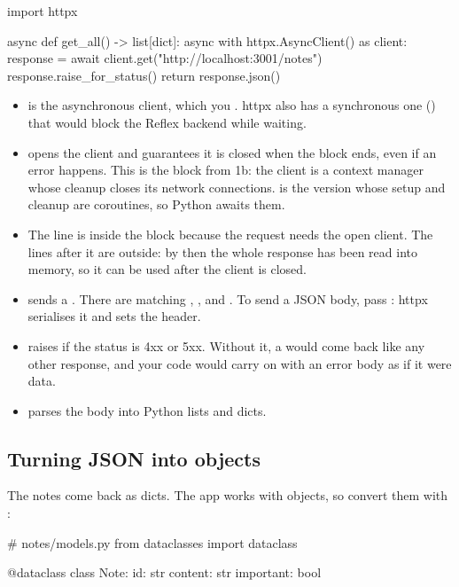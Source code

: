 \begin{py}
import httpx


async def get_all() -> list[dict]:
	async with httpx.AsyncClient() as client:
		response = await client.get("http://localhost:3001/notes")
	response.raise_for_status()
	return response.json()
\end{py}

\begin{itemize}
\item {} is the asynchronous client, which you . httpx also has a synchronous one () that would block the Reflex backend while waiting.
\item {} opens the client and guarantees it is closed when the block ends, even if an error happens. This is the  block from 1b: the client is a context manager whose cleanup closes its network connections.  is the version whose setup and cleanup are coroutines, so Python awaits them.
\item The  line is inside the  block because the request needs the open client. The lines after it are outside: by then the whole response has been read into memory, so it can be used after the client is closed.
\item {} sends a . There are matching , ,  and . To send a JSON body, pass : httpx serialises it and sets the  header.
\item {} raises  if the status is 4xx or 5xx. Without it, a  would come back like any other response, and your code would carry on with an error body as if it were data.
\item {} parses the body into Python lists and dicts.
\end{itemize}

\subsection{Turning JSON into objects}

The notes come back as dicts. The app works with  objects, so convert them with \cd{**}:

\begin{py}
# notes/models.py
from dataclasses import dataclass


@dataclass
class Note:
	id: str
	content: str
	important: bool
\end{py}

